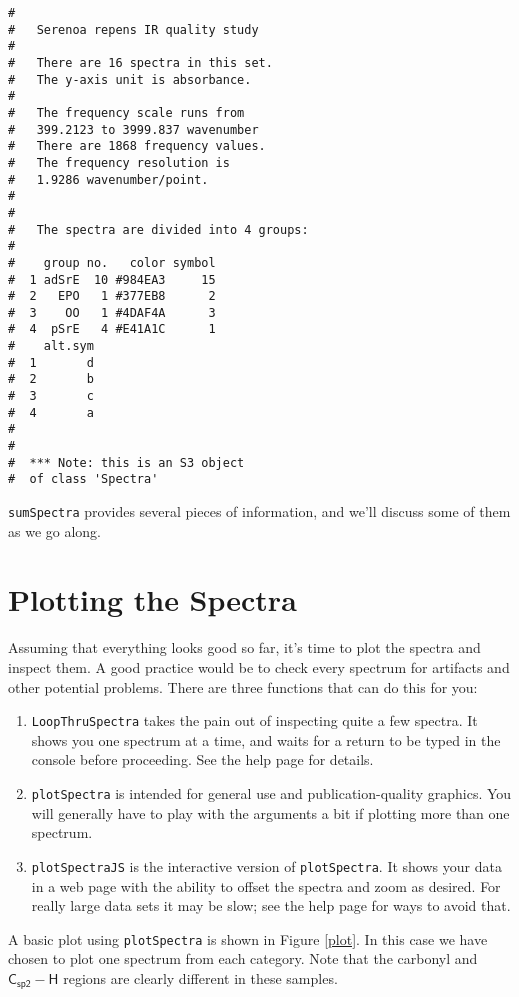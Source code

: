 \documentclass[letter,10pt,twocolumn,twoside,printwatermark=false]{pinp}
\begin{document}
\begin{ShadedResult}
\begin{verbatim}
#  
#   Serenoa repens IR quality study 
#  
#   There are 16 spectra in this set.
#   The y-axis unit is absorbance.
#  
#   The frequency scale runs from
#   399.2123 to 3999.837 wavenumber
#   There are 1868 frequency values.
#   The frequency resolution is
#   1.9286 wavenumber/point.
#  
#  
#   The spectra are divided into 4 groups: 
#  
#    group no.   color symbol
#  1 adSrE  10 #984EA3     15
#  2   EPO   1 #377EB8      2
#  3    OO   1 #4DAF4A      3
#  4  pSrE   4 #E41A1C      1
#    alt.sym
#  1       d
#  2       b
#  3       c
#  4       a
#  
#  
#  *** Note: this is an S3 object
#  of class 'Spectra'
\end{verbatim}
\end{ShadedResult}

\texttt{sumSpectra} provides several pieces of information, and we'll
discuss some of them as we go along.

\hypertarget{plotting-the-spectra}{%
\section{Plotting the Spectra}\label{plotting-the-spectra}}

Assuming that everything looks good so far, it's time to plot the
spectra and inspect them. A good practice would be to check every
spectrum for artifacts and other potential problems. There are three
functions that can do this for you:

\begin{enumerate}
  \item \texttt{LoopThruSpectra} takes the pain out of inspecting quite a few spectra.  It shows you one spectrum at a time, and waits for a return to be typed in the console before proceeding.  See the help page for details.
  \item \texttt{plotSpectra} is intended for general use and publication-quality graphics.  You will generally have to play with the arguments a bit if plotting more than one spectrum.
  \item \texttt{plotSpectraJS} is the interactive version of \texttt{plotSpectra}.  It shows your data in a web page with the ability to offset the spectra and zoom as desired.  For really large data sets it may be slow; see the help page for ways to avoid that.
\end{enumerate}

A basic plot using \texttt{plotSpectra} is shown in Figure \ref{plot}.
In this case we have chosen to plot one spectrum from each category.
Note that the carbonyl and \(\mathsf{{C_{sp2}-H}}\) regions are clearly
different in these samples.
\end{document}
